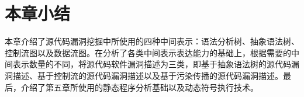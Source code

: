 %
%
%
%




\section{本章小结}

本章介绍了源代码漏洞挖掘中所使用的四种中间表示：语法分析树、抽象语法树、控制流图以及数据流图。在分析了各类中间表示表达能力的基础上，根据需要的中间表示数量的不同，将源代码软件漏洞描述为三类，即基于抽象语法树的源代码漏洞描述、基于控制流的源代码漏洞描述以及基于污染传播的源代码漏洞描述。最后，介绍了第五章所使用的静态程序分析基础以及动态符号执行技术。
